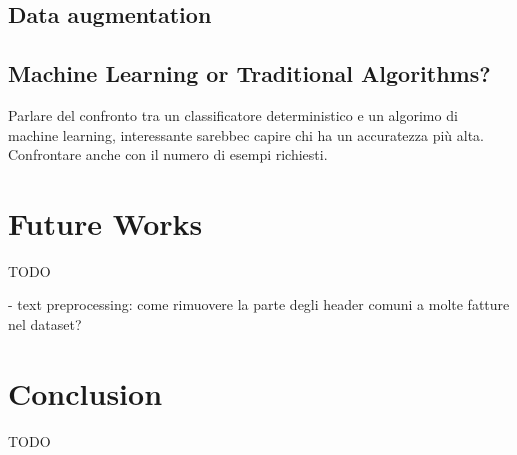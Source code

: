 \documentclass[10pt,twocolumn,letterpaper]{article}
\begin{document}
\subsection{Data augmentation}

\subsection{Machine Learning or Traditional Algorithms?}
Parlare del confronto tra un classificatore deterministico e un algorimo di machine learning, interessante sarebbec capire chi ha un accuratezza più alta. Confrontare anche con il numero di esempi richiesti.

\section{Future Works}
\label{sec:future-works}

TODO

- text preprocessing: come rimuovere la parte degli header comuni a molte fatture nel dataset?

\section{Conclusion}
\label{sec:conclusion}

TODO

{\small


}
\end{document}
